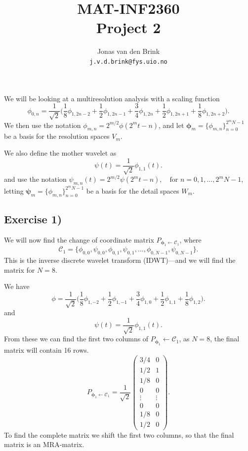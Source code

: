 \documentclass[a4paper, 11pt, notitlepage, english]{article}
\author{Jonas van den Brink \\ \texttt{j.v.d.brink@fys.uio.no}}
\title{MAT-INF2360 \\ Project 2}
\newcommand{\bt}[1]{\boldsymbol{#1}}
\begin{document}
\vspace {2cm}
\maketitle
\vspace {2 cm}

We will be looking at a multiresolution analysis with a scaling function
$$
    \phi_{0,n} = \frac{1}{\sqrt{2}}\bigg(\frac{1}{8}\phi_{1,2n-2}+ \frac{1}{2}\phi_{1,2n-1}+\frac{3}{4}\phi_{1,2n}+\frac{1}{2}\phi_{1,2n+1}+\frac{1}{8}\phi_{1,2n+2}\bigg).
$$
We then use the notation
$\phi_{m,n} = 2^{m/2} \phi(2^m t-n)$, and let $\bt{\phi}_m = \{\phi_{m,n}\}_{n=0}^{2^mN-1}$ be a basis for the resolution spaces $V_m$.

We also define the mother wavelet as
$$\psi(t) = \frac{1}{\sqrt{2}}\phi_{1,1}(t).$$
and use the notation
$\psi_{m,n}(t) = 2^{m/2}\psi(2^m t- n), \quad \mbox{for } n=0,1,\ldots,2^m N-1$, letting 
$\bt{\psi}_m = \{\phi_{m,n}\}_{n=0}^{2^mN-1}$ be a basis for the detail spaces $W_m$.

\clearpage

\subsection*{Exercise 1)}
We will now find the change of coordinate matrix 
$P_{\bt{\phi}_1 \leftarrow \mathscr{C}_1}$, where
$$\mathscr{C}_1 = \{\phi_{0,0}, \psi_{0,0}, \phi_{0,1}, \psi_{0,1},\ldots,\phi_{0,N-1}, \psi_{0,N-1}\}.$$
This is the inverse discrete wavelet transform (IDWT)---and we will find the matrix for $N=8$.

We have
$$
\phi = \frac{1}{\sqrt{2}}\bigg(\frac{1}{8}\phi_{1,-2} + \frac{1}{2}\phi_{1,-1} + \frac{3}{4}\phi_{1,0} + \frac{1}{2}\phi_{1,1} + \frac{1}{8}\phi_{1,2}\bigg).$$
and $$\psi(t) = \frac{1}{\sqrt{2}}\phi_{1,1}(t).$$
From these we can find the first two columns of $P_{\bt{\phi}_1} \leftarrow \mathscr{C}_1$, as $N=8$, the final matrix will contain 16 rows. 
$$P_{\bt{\phi}_1 \leftarrow \mathscr{C}_1} = \frac{1}{\sqrt{2}}\begin{pmatrix}
3/4 & 0 \\
1/2 & 1 \\
1/8 & 0 \\
0 & 0 \\
\vdots & \vdots \\
0 & 0 \\
1/8 & 0 \\
1/2 & 0 
\end{pmatrix}.$$
To find the complete matrix we shift the first two columns, so that the final matrix is an MRA-matrix. 
\end{document}
